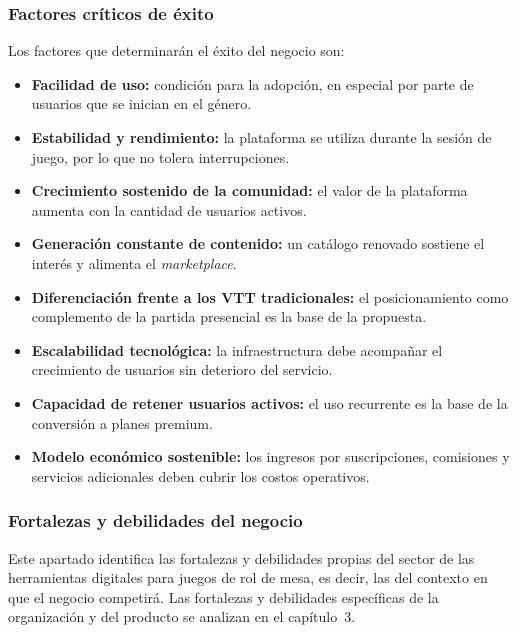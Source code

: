 \subsubsection{Factores críticos de éxito}\label{sec:fce}
Los factores que determinarán el éxito del negocio son:
\begin{itemize}
  \item \textbf{Facilidad de uso:} condición para la adopción, en especial por parte de usuarios que se inician en el género.
  \item \textbf{Estabilidad y rendimiento:} la plataforma se utiliza durante la sesión de juego, por lo que no tolera interrupciones.
  \item \textbf{Crecimiento sostenido de la comunidad:} el valor de la plataforma aumenta con la cantidad de usuarios activos.
  \item \textbf{Generación constante de contenido:} un catálogo renovado sostiene el interés y alimenta el \textit{marketplace}.
  \item \textbf{Diferenciación frente a los VTT tradicionales:} el posicionamiento como complemento de la partida presencial es la base de la propuesta.
  \item \textbf{Escalabilidad tecnológica:} la infraestructura debe acompañar el crecimiento de usuarios sin deterioro del servicio.
  \item \textbf{Capacidad de retener usuarios activos:} el uso recurrente es la base de la conversión a planes premium.
  \item \textbf{Modelo económico sostenible:} los ingresos por suscripciones, comisiones y servicios adicionales deben cubrir los costos operativos.
\end{itemize}

\subsubsection{Fortalezas y debilidades del negocio}\label{sec:fortalezas-debilidades-sector}
Este apartado identifica las fortalezas y debilidades propias del sector de las herramientas digitales para juegos de rol de mesa, es decir, las del contexto en que el negocio competirá. Las fortalezas y debilidades específicas de la organización y del producto se analizan en el capítulo~3.

